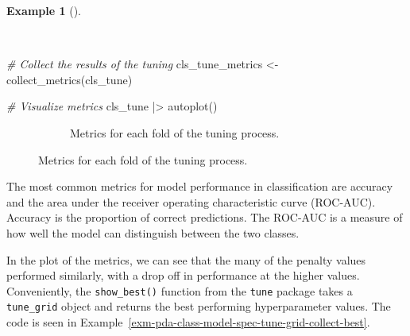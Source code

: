 \documentclass[
  letterpaper,
]{latex/krantz}
\newenvironment{Shaded}{\begin{snugshade}}{\end{snugshade}}
\newcommand{\CommentTok}[1]{\textcolor[rgb]{0.00,0.00,0.00}{\textit{#1}}}
\newcommand{\FunctionTok}[1]{\textcolor[rgb]{0.00,0.00,0.00}{#1}}
\newcommand{\NormalTok}[1]{\textcolor[rgb]{0.00,0.00,0.00}{#1}}
\newcommand{\OtherTok}[1]{\textcolor[rgb]{0.00,0.00,0.00}{#1}}
\newcommand{\SpecialCharTok}[1]{\textcolor[rgb]{0.00,0.00,0.00}{#1}}
\theoremstyle{definition}
\newtheorem{example}{Example}[chapter]
\theoremstyle{remark}
\begin{document}
\begin{example}[]\protect\hypertarget{exm-pda-class-model-spec-tune-grid-collect}{}\label{exm-pda-class-model-spec-tune-grid-collect}

~

\begin{Shaded}
\begin{Highlighting}[]
\CommentTok{\# Collect the results of the tuning}
\NormalTok{cls\_tune\_metrics }\OtherTok{\textless{}{-}}
  \FunctionTok{collect\_metrics}\NormalTok{(cls\_tune)}

\CommentTok{\# Visualize metrics}
\NormalTok{cls\_tune }\SpecialCharTok{|\textgreater{}} \FunctionTok{autoplot}\NormalTok{()}
\end{Highlighting}
\end{Shaded}

\begin{figure}

\begin{minipage}{\linewidth}

\begin{figure}[H]


\caption{\label{fig-pda-class-model-spec-tune-grid-collect}Metrics for
each fold of the tuning process.}

\end{figure}%

\end{minipage}%

\end{figure}%

\end{example}

The most common metrics for model performance in classification are
accuracy and the area under the receiver operating characteristic curve
(ROC-AUC). Accuracy is the proportion of correct predictions. The
ROC-AUC is a measure of how well the model can distinguish between the
two classes.

In the plot of the metrics, we can see that the many of the penalty
values performed similarly, with a drop off in performance at the higher
values. Conveniently, the \texttt{show\_best()} function from the
\texttt{tune} package takes a \texttt{tune\_grid} object and returns the
best performing hyperparameter values. The code is seen in
Example~\ref{exm-pda-class-model-spec-tune-grid-collect-best}.
\end{document}
